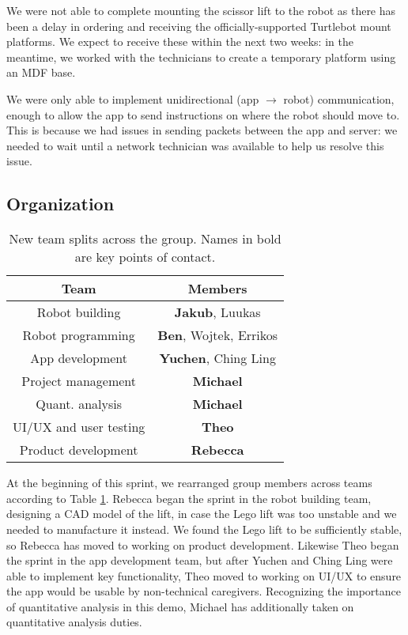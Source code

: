 \documentclass{article}
\begin{document}
We were not able to complete mounting the scissor lift to the robot as there has been a delay in ordering and receiving the officially-supported Turtlebot mount platforms. We expect to receive these within the next two weeks: in the meantime, we worked with the technicians to create a temporary platform using an MDF base.

We were only able to implement unidirectional (app $\rightarrow$ robot) communication, enough to allow the app to send instructions on where the robot should move to. This is because we had issues in sending packets between the app and server: we needed to wait until a network technician was available to help us resolve this issue. 

\subsection{Organization}
\begin{table}[]
  \begin{tabular}{c|c}
    Team & Members \\
    \hline
    Robot building & {\bf Jakub}, Luukas \\
    Robot programming & {\bf Ben}, Wojtek, Errikos \\
    App development & {\bf Yuchen}, Ching Ling \\
    Project management & {\bf Michael}  \\
    Quant. analysis & {\bf Michael} \\
    UI/UX and user testing & {\bf Theo}  \\
    Product development & {\bf Rebecca}  
  \end{tabular}
  \caption{New team splits across the group. Names in bold are key points of contact.}
  \label{tab:group-split}
\end{table}

At the beginning of this sprint, we rearranged group members across teams according to Table \ref{tab:group-split}. Rebecca began the sprint in the robot building team, designing a CAD model of the lift, in case the Lego lift was too unstable and we needed to manufacture it instead. We found the Lego lift to be sufficiently stable, so Rebecca has moved to working on product development. Likewise Theo began the sprint in the app development team, but after Yuchen and Ching Ling were able to implement key functionality, Theo moved to working on UI/UX to ensure the app would be usable by non-technical caregivers. Recognizing the importance of quantitative analysis in this demo, Michael has additionally taken on quantitative analysis duties. 
\end{document}
